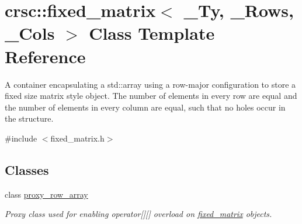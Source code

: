 \hypertarget{classcrsc_1_1fixed__matrix}{}\section{crsc\+:\+:fixed\+\_\+matrix$<$ \+\_\+\+Ty, \+\_\+\+Rows, \+\_\+\+Cols $>$ Class Template Reference}
\label{classcrsc_1_1fixed__matrix}


A container encapsulating a {\ttfamily std\+::array} using a row-\/major configuration to store a fixed size matrix style object. The number of elements in every row are equal and the number of elements in every column are equal, such that no holes occur in the structure.  




{\ttfamily \#include $<$fixed\+\_\+matrix.\+h$>$}

\subsection*{Classes}
\begin{DoxyCompactItemize}
\item 
class \hyperlink{classcrsc_1_1fixed__matrix_1_1proxy__row__array}{proxy\+\_\+row\+\_\+array}
\begin{DoxyCompactList}\small\item\em Proxy class used for enabling operator\mbox{[}\mbox{]}\mbox{[}\mbox{]} overload on \hyperlink{classcrsc_1_1fixed__matrix}{fixed\+\_\+matrix} objects. \end{DoxyCompactList}\end{DoxyCompactItemize}
